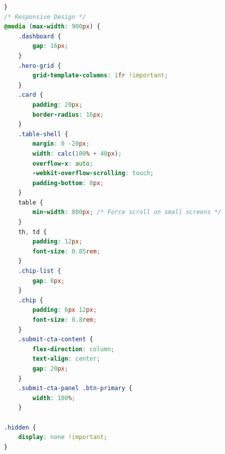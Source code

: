 \documentclass[12pt, a4paper, onecolumn]{report}
\begin{document}
\begin{lstlisting}[language=CSS]
}
/* Responsive Design */
@media (max-width: 900px) {
    .dashboard {
        gap: 16px;
    }
    .hero-grid {
        grid-template-columns: 1fr !important;
    }
    .card {
        padding: 20px;
        border-radius: 16px;
    }
    .table-shell {
        margin: 0 -20px;
        width: calc(100% + 40px);
        overflow-x: auto;
        -webkit-overflow-scrolling: touch;
        padding-bottom: 8px;
    }
    table {
        min-width: 800px; /* Force scroll on small screens */
    }
    th, td {
        padding: 12px;
        font-size: 0.85rem;
    }
    .chip-list {
        gap: 8px;
    }
    .chip {
        padding: 6px 12px;
        font-size: 0.8rem;
    }
    .submit-cta-content {
        flex-direction: column;
        text-align: center;
        gap: 20px;
    }
    .submit-cta-panel .btn-primary {
        width: 100%;
    }

.hidden {
    display: none !important;
}
\end{lstlisting}
\end{document}
